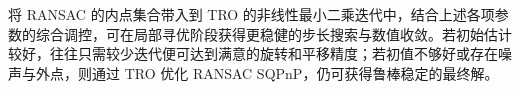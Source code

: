 将 RANSAC 的内点集合带入到 TRO 的非线性最小二乘迭代中，结合上述各项参数的综合调控，可在局部寻优阶段获得更稳健的步长搜索与数值收敛。若初始估计较好，往往只需较少迭代便可达到满意的旋转和平移精度；若初值不够好或存在噪声与外点，则通过 TRO 优化 RANSAC SQPnP，仍可获得鲁棒稳定的最终解。
%			
%			
%			

